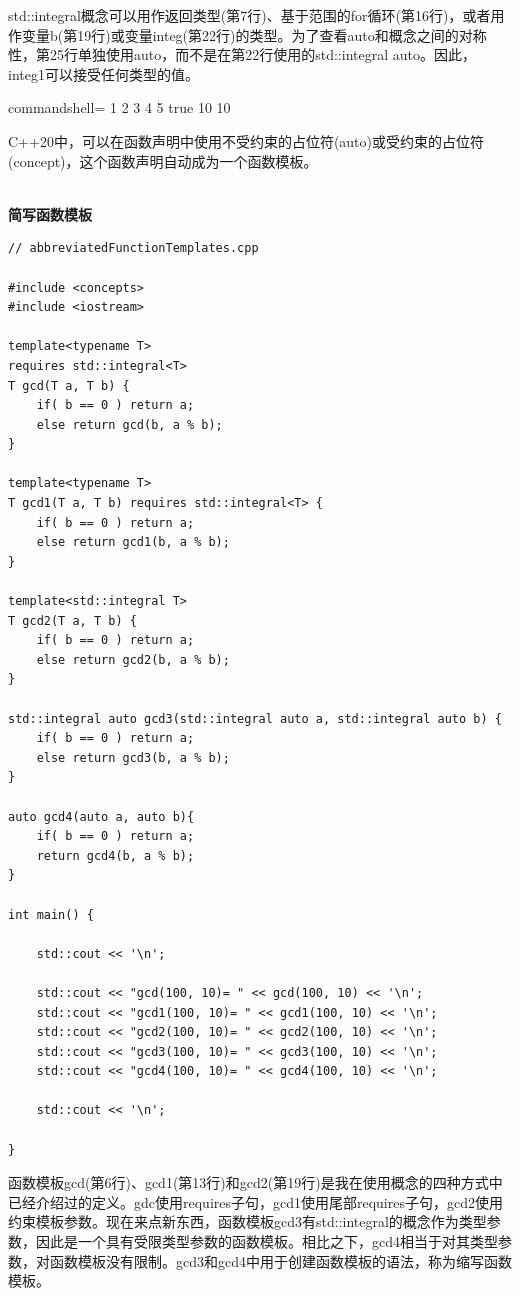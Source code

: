 std::integral概念可以用作返回类型(第7行)、基于范围的for循环(第16行)，或者用作变量b(第19行)或变量integ(第22行)的类型。为了查看auto和概念之间的对称性，第25行单独使用auto，而不是在第22行使用的std::integral auto。因此，integ1可以接受任何类型的值。

\begin{tcblisting}{commandshell={}}
1 2 3 4 5
true
10
10
\end{tcblisting}


C++20中，可以在函数声明中使用不受约束的占位符(auto)或受约束的占位符(concept)，这个函数声明自动成为一个函数模板。

\hspace*{\fill} \\ %
\noindent
\textbf{简写函数模板}
\begin{lstlisting}[style=styleCXX]
// abbreviatedFunctionTemplates.cpp

#include <concepts>
#include <iostream>

template<typename T>
requires std::integral<T>
T gcd(T a, T b) {
	if( b == 0 ) return a;
	else return gcd(b, a % b);
}

template<typename T>
T gcd1(T a, T b) requires std::integral<T> {
	if( b == 0 ) return a;
	else return gcd1(b, a % b);
}

template<std::integral T>
T gcd2(T a, T b) {
	if( b == 0 ) return a;
	else return gcd2(b, a % b);
}

std::integral auto gcd3(std::integral auto a, std::integral auto b) {
	if( b == 0 ) return a;
	else return gcd3(b, a % b);
}

auto gcd4(auto a, auto b){
	if( b == 0 ) return a;
	return gcd4(b, a % b);
}

int main() {

	std::cout << '\n';
	
	std::cout << "gcd(100, 10)= " << gcd(100, 10) << '\n';
	std::cout << "gcd1(100, 10)= " << gcd1(100, 10) << '\n';
	std::cout << "gcd2(100, 10)= " << gcd2(100, 10) << '\n';
	std::cout << "gcd3(100, 10)= " << gcd3(100, 10) << '\n';
	std::cout << "gcd4(100, 10)= " << gcd4(100, 10) << '\n';
	
	std::cout << '\n';

}
\end{lstlisting}

函数模板gcd(第6行)、gcd1(第13行)和gcd2(第19行)是我在使用概念的四种方式中已经介绍过的定义。gdc使用requires子句，gcd1使用尾部requires子句，gcd2使用约束模板参数。现在来点新东西，函数模板gcd3有std::integral的概念作为类型参数，因此是一个具有受限类型参数的函数模板。相比之下，gcd4相当于对其类型参数，对函数模板没有限制。gcd3和gcd4中用于创建函数模板的语法，称为缩写函数模板。

